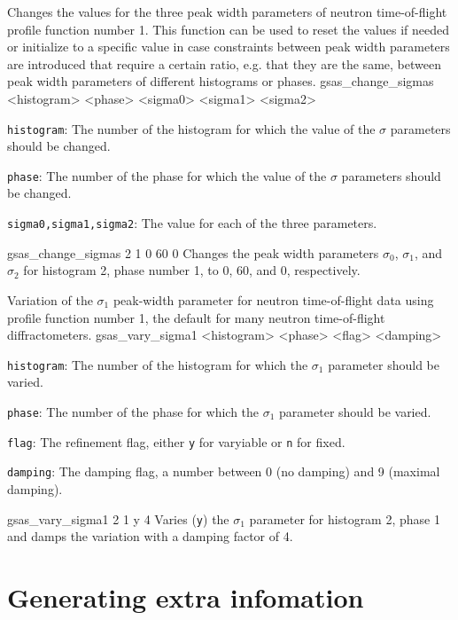 {
Changes the values for the three peak width parameters of neutron time-of-flight profile function number 1. This function can be used to reset the values if needed or initialize to a specific value in case constraints between peak width parameters are introduced that require a certain ratio, e.g. that they are the same, between peak width parameters of different histograms or phases.
}{
gsas\_change\_sigmas <histogram> <phase> <sigma0> <sigma1> <sigma2>
}{
\item \texttt{histogram}: The number of the histogram for which the value of the $\sigma$ parameters should be changed.
\item \texttt{phase}: The number of the phase for which the value of the $\sigma$ parameters should be changed.
\item \texttt{sigma0,sigma1,sigma2}: The value for each of the three parameters.
}{
gsas\_change\_sigmas 2 1 0 60 0
}{
Changes the peak width parameters $\sigma_0$, $\sigma_1$, and $\sigma_2$ for histogram 2, phase number 1, to 0, 60, and 0, respectively.
}

{
Variation of the $\sigma_1$ peak-width parameter for neutron time-of-flight data using profile function number 1, the default for many neutron time-of-flight diffractometers.
}{
gsas\_vary\_sigma1 <histogram> <phase> <flag> <damping>
}{
\item \texttt{histogram}: The number of the histogram for which the $\sigma_1$ parameter should be varied.
\item \texttt{phase}: The number of the phase for which the $\sigma_1$ parameter should be varied.
\item \texttt{flag}: The refinement flag, either \texttt{y} for varyiable or \texttt{n} for fixed.
\item \texttt{damping}: The damping flag, a number between 0 (no damping) and 9 (maximal damping).
}{
gsas\_vary\_sigma1 2 1 y 4
}{
Varies (\texttt{y}) the $\sigma_1$ parameter for histogram 2, phase 1 and damps the variation with a damping factor of 4.
}

\section{Generating extra infomation}

